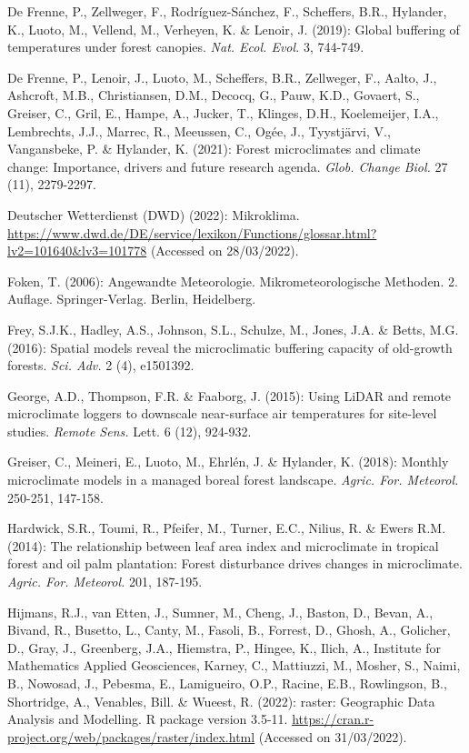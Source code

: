 \documentclass[5p]{elsarticle} %
\newlength{\cslhangindent}
\newlength{\cslentryspacingunit} %
\newenvironment{CSLReferences}[2] %
 {%
  \setlength{\parindent}{0pt}
  \ifodd #1
  \let\oldpar\par
  \def\par{\hangindent=\cslhangindent\oldpar}
  \fi
  \setlength{\parskip}{#2\cslentryspacingunit}
 }%
 {}
\begin{document}
\begin{CSLReferences}{1}{0}
De Frenne, P., Zellweger, F., Rodríguez-Sánchez, F., Scheffers, B.R., Hylander, K., Luoto, M., Vellend, M., Verheyen, K. \& Lenoir, J. (2019): Global buffering of temperatures under forest canopies. \emph{Nat. Ecol. Evol.} 3, 744-749.

De Frenne, P., Lenoir, J., Luoto, M., Scheffers, B.R., Zellweger, F., Aalto, J., Ashcroft, M.B., Christiansen, D.M., Decocq, G., Pauw, K.D., Govaert, S., Greiser, C., Gril, E., Hampe, A., Jucker, T., Klinges, D.H., Koelemeijer, I.A., Lembrechts, J.J., Marrec, R., Meeussen, C., Ogée, J., Tyystjärvi, V., Vangansbeke, P. \& Hylander, K. (2021): Forest microclimates and climate change: Importance, drivers and future research agenda. \emph{Glob. Change Biol.} 27 (11), 2279-2297.

Deutscher Wetterdienst (DWD) (2022): Mikroklima. \url{https://www.dwd.de/DE/service/lexikon/Functions/glossar.html?lv2=101640&lv3=101778} (Accessed on 28/03/2022).

Foken, T. (2006): Angewandte Meteorologie. Mikrometeorologische Methoden. 2. Auflage. Springer-Verlag. Berlin, Heidelberg.

Frey, S.J.K., Hadley, A.S., Johnson, S.L., Schulze, M., Jones, J.A. \& Betts, M.G. (2016): Spatial models reveal the microclimatic buffering capacity of old-growth forests. \emph{Sci. Adv.} 2 (4), e1501392.

George, A.D., Thompson, F.R. \& Faaborg, J. (2015): Using LiDAR and remote microclimate loggers to downscale near-surface air temperatures for site-level studies. \emph{Remote Sens.} Lett. 6 (12), 924-932.

Greiser, C., Meineri, E., Luoto, M., Ehrlén, J. \& Hylander, K. (2018): Monthly microclimate models in a managed boreal forest landscape. \emph{Agric. For. Meteorol.} 250-251, 147-158.

Hardwick, S.R., Toumi, R., Pfeifer, M., Turner, E.C., Nilius, R. \& Ewers R.M. (2014): The relationship between leaf area index and microclimate in tropical forest and oil palm plantation: Forest disturbance drives changes in microclimate. \emph{Agric. For. Meteorol.} 201, 187-195.

Hijmans, R.J., van Etten, J., Sumner, M., Cheng, J., Baston, D., Bevan, A., Bivand, R., Busetto, L., Canty, M., Fasoli, B., Forrest, D., Ghosh, A., Golicher, D., Gray, J., Greenberg, J.A., Hiemstra, P., Hingee, K., Ilich, A., Institute for Mathematics Applied Geosciences, Karney, C., Mattiuzzi, M., Mosher, S., Naimi, B., Nowosad, J., Pebesma, E., Lamigueiro, O.P., Racine, E.B., Rowlingson, B., Shortridge, A., Venables, Bill. \& Wueest, R. (2022): raster: Geographic Data Analysis and Modelling. R package version 3.5-11. \url{https://cran.r-project.org/web/packages/raster/index.html} (Accessed on 31/03/2022).


\end{CSLReferences}
\end{document}
